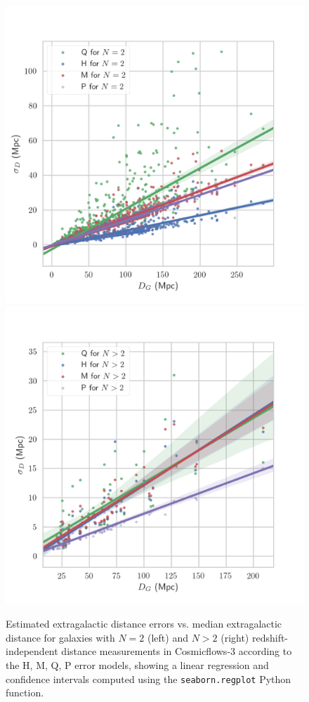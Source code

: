 \documentclass[a4paper,fleqn,usenatbib]{mnras}
\begin{document}
\begin{figure}
	\includegraphics[scale=0.69]{f28CF3low.png}
	\includegraphics[scale=0.69]{f29CF3high.png}
    \caption{Estimated extragalactic distance errors vs. median extragalactic distance for galaxies with $N=2$ (left) and $N>2$ (right) redshift-independent distance measurements in Cosmicflows-3 according to the H, M, Q, P error models, showing a linear regression and confidence intervals computed using the \texttt{seaborn.regplot} Python function.}
    \label{fig:CF3low}
\end{figure}
\end{document}
